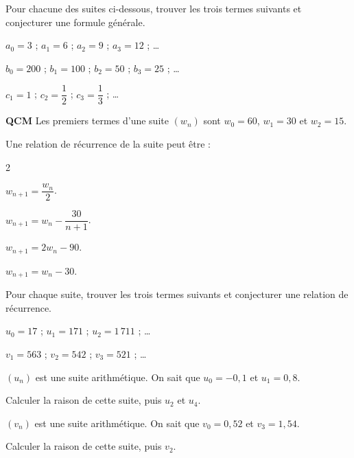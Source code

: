 \documentclass[12pt,a4paper]{book}
\begin{document}
Pour chacune des suites ci-dessous, trouver les trois termes suivants et conjecturer une formule générale.

\begin{enumMet}
	\item $a_0=3$ ; $a_1=6$ ; $a_2=9$ ; $a_3=12$ ; \dots
	\item $b_0=200$ ; $b_1=100$ ; $b_2=50$ ; $b_3=25$ ; \dots
	\item $c_1=1$ ; $c_2=\dfrac{1}{2}$ ; $c_3=\dfrac{1}{3}$ ; \dots
\end{enumMet}


\exerciceDS{}

\textbf{QCM} Les premiers termes d'une suite $(w_n)$ sont $w_0=60$, $w_1=30$ et $w_2=15$.

Une relation de récurrence de la suite peut être :
\begin{multicols}{2}
\begin{enumMet}
	\item $w_{n+1}=\dfrac{w_n}{2}$.
	\item $w_{n+1}=w_n-\dfrac{30}{n+1}$.
	\item $w_{n+1}=2w_n-90$.
	\item $w_{n+1}=w_n-30$.
\end{enumMet}
\end{multicols}

\exerciceDS{}

Pour chaque suite, trouver les trois termes suivants et conjecturer une relation de récurrence.
\begin{enumMet}
	\item $u_0=17$ ; $u_1=171$ ; $u_2=1\,711$ ; \dots
	\item $v_1=563$ ; $v_2=542$ ; $v_3=521$ ; \dots
\end{enumMet}


\exerciceDS{}

$(u_n)$ est une suite arithmétique. On sait que $u_0=-0,1$ et $u_1=0,8$.
\begin{itemMet}
	\item Calculer la raison de cette suite, puis $u_2$ et $u_4$.
\end{itemMet}

\exerciceDS{}

$(v_n)$ est une suite arithmétique. On sait que $v_0=0,52$ et $v_3=1,54$.
\begin{itemMet}
	\item Calculer la raison de cette suite, puis $v_2$.
\end{itemMet}
\end{document}
